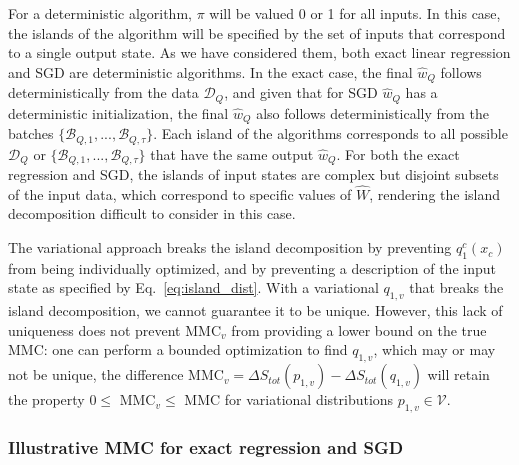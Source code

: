 \documentclass[12pt,onecolumn, margin=1in]{IEEEtran}
\newcommand{\Wh}{\hat{W}}
\newcommand{\wh}{\hat{w}}
\begin{document}
For a deterministic algorithm, $\pi$ will be valued 0 or 1 for all inputs. In this case, the islands of the algorithm will be specified by the set of inputs that correspond to a single output state. As we have considered them, both exact linear regression and SGD are deterministic algorithms. In the exact case, the final $\wh_Q$ follows deterministically from the data $\mathcal{D}_Q$, and given that for SGD $\wh_Q$ has a deterministic initialization, the final $\wh_Q$ also follows deterministically from the batches $\{\mathcal{B}_{Q,1},...,\mathcal{B}_{Q,\tau}\}$. Each island of the algorithms corresponds to all possible $\mathcal{D}_Q$ or $\{\mathcal{B}_{Q,1},...,\mathcal{B}_{Q,\tau}\}$ that have the same output $\wh_Q$. For both the exact regression and SGD, the islands of input states are complex but disjoint subsets of the input data, which correspond to specific values of $\Wh$, rendering the island decomposition difficult to consider in this case.

The variational approach breaks the island decomposition by preventing $q_1^c(x_c)$ from being individually optimized, and by preventing a description of the input state as specified by Eq.~\eqref{eq:island_dist}. With a variational $q_{1,v}$ that breaks the island decomposition, we cannot guarantee it to be unique. However, this lack of uniqueness does not prevent MMC$_v$ from providing a lower bound on the true MMC: one can perform a bounded optimization to find $q_{1,v}$, which may or may not be unique, the difference MMC$_v = \Delta S_{tot}(p_{1,v}) - \Delta S_{tot}(q_{1,v})$ will retain the property $0 \leq $ MMC$_v \leq $ MMC for variational distributions $p_{1,v} \in \mathcal{V}$. 

\subsubsection{Illustrative MMC for exact regression and SGD}
\end{document}
